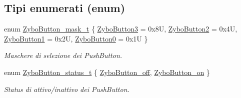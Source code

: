 \subsection*{Tipi enumerati (enum)}
\begin{DoxyCompactItemize}
\item 
enum \hyperlink{group___button_ga4d26a5f6cad606de534ba034e0ba42dd}{Zybo\+Button\+\_\+mask\+\_\+t} \{ \hyperlink{group___button_gga4d26a5f6cad606de534ba034e0ba42ddaabede392be8cae14b8a070a804c754e8}{Zybo\+Button3} = 0x8U, 
\hyperlink{group___button_gga4d26a5f6cad606de534ba034e0ba42dda2aa888c8f01ac8a79013e5ebc9eef609}{Zybo\+Button2} = 0x4U, 
\hyperlink{group___button_gga4d26a5f6cad606de534ba034e0ba42dda29c35ef3133898c050f675a60de66dd7}{Zybo\+Button1} = 0x2U, 
\hyperlink{group___button_gga4d26a5f6cad606de534ba034e0ba42dda2f821ce9661687aefb0ec4de65911570}{Zybo\+Button0} = 0x1U
 \}\begin{DoxyCompactList}\small\item\em Maschere di selezione dei Push\+Button. \end{DoxyCompactList}
\item 
enum \hyperlink{group___button_ga85c290bfa232cab213e69200bf78e06a}{Zybo\+Button\+\_\+status\+\_\+t} \{ \hyperlink{group___button_gga85c290bfa232cab213e69200bf78e06aacd110f28912806bcec929721e8737399}{Zybo\+Button\+\_\+off}, 
\hyperlink{group___button_gga85c290bfa232cab213e69200bf78e06aa49bf4a6902270f28bc6a1146fbd1b1fe}{Zybo\+Button\+\_\+on}
 \}\begin{DoxyCompactList}\small\item\em Status di attivo/inattivo dei Push\+Button. \end{DoxyCompactList}
\end{DoxyCompactItemize}
